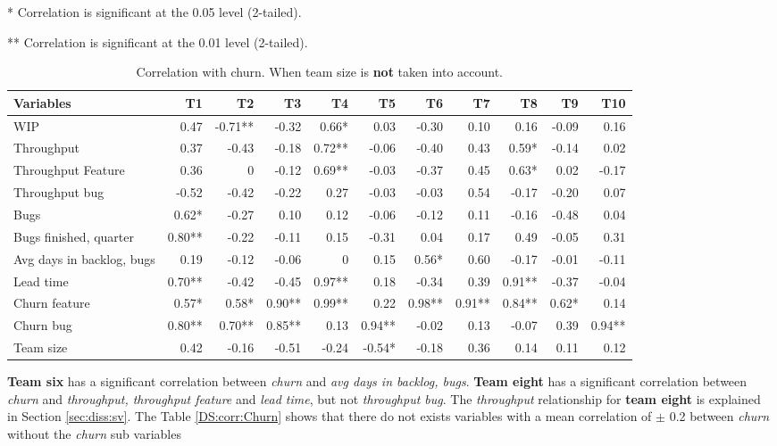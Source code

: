 \documentclass[UKenglish]{ifimaster}  %
\begin{document}
\begin{minipage}[t]{\linewidth}
\begin{table}[H]
 \caption{Correlation with churn. When team size is \textbf{not} taken into account.}
 \centerline {* Correlation is significant at the 0.05 level (2-tailed).}
\centerline{** Correlation is significant at the 0.01 level (2-tailed).}
 \begin{adjustwidth}{-2cm}{}
 \centering
 \begin{tabular}{|l|r|r|r|r|r|r|r|r|r|r|}
\hline
 \textbf{Variables} & \bf{T1} & \bf{T2} & \bf{T3} & \bf{T4} & \bf{T5} & \bf{T6} & \bf{T7} & \bf{T8} & \bf{T9} & \bf{T10}\\ \hline
 WIP  & 0.47 & -0.71** & -0.32 & 0.66* & 0.03 & -0.30 & 0.10 & 0.16 & -0.09 & 0.16 \\ \hline
 Throughput  & 0.37 & -0.43 & -0.18 & 0.72** & -0.06 & -0.40 & 0.43 & 0.59* & -0.14 & 0.02 \\ \hline
 Throughput Feature  & 0.36 & 0 &-0.12 & 0.69** & -0.03 & -0.37 & 0.45 & 0.63* & 0.02 & -0.17 \\ \hline
 Throughput bug  & -0.52 & -0.42 & -0.22 & 0.27 & -0.03 & -0.03 & 0.54 & -0.17 & -0.20 & 0.07 \\ \hline
 Bugs  & 0.62* & -0.27 & 0.10 & 0.12 & -0.06 & -0.12 & 0.11 & -0.16 & -0.48 & 0.04 \\ \hline
 Bugs finished, quarter  & 0.80** & -0.22 & -0.11 & 0.15 & -0.31 & 0.04 & 0.17 & 0.49 & -0.05 & 0.31 \\ \hline
 Avg days in backlog, bugs  & 0.19 & -0.12 & -0.06 & 0 &0.15 & 0.56* & 0.60 & -0.17 & -0.01 & -0.11 \\ \hline
 Lead time  & 0.70** & -0.42 & -0.45 & 0.97** & 0.18 & -0.34 & 0.39 & 0.91** & -0.37 & -0.04 \\ \hline
 Churn feature  & 0.57* & 0.58* & 0.90** & 0.99** & 0.22 & 0.98** & 0.91** & 0.84** & 0.62* & 0.14 \\ \hline
 Churn bug  & 0.80** & 0.70** & 0.85** & 0.13 & 0.94** & -0.02 & 0.13 & -0.07 & 0.39 & 0.94** \\ \hline
 Team size  & 0.42 & -0.16 & -0.51 & -0.24 & -0.54* & -0.18 & 0.36 & 0.14 & 0.11 & 0.12 \\ \hline
\end{tabular}
 \label{corr:churn}

\end{adjustwidth}
\end{table}
\end{minipage}


\textbf{Team six} has a significant correlation between \textit{churn} and \textit{avg days in backlog, bugs}. \textbf{Team eight} has a significant correlation between \textit{churn} and  \textit{throughput, throughput feature} and \textit{lead time}, but not \textit{throughput bug}. The \textit{throughput} relationship for \textbf{team eight} is explained in Section \ref{sec:diss:sv}. The Table \ref{DS:corr:Churn} shows that there do not exists variables with a mean correlation of $\pm$ 0.2 between \textit{churn} without the \textit{churn} sub variables 
\end{document}
